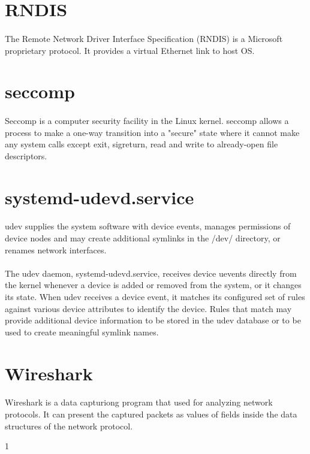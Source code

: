\documentclass[mscthesis]{usiinfthesis}
\begin{document}
\section{RNDIS}\label{sec:RNDIS}
\paragraph{}
The Remote Network Driver Interface Specification (RNDIS) is a Microsoft proprietary protocol. It provides a virtual Ethernet link to host OS.

\section{seccomp}\label{sec:seccomp}
\paragraph{}
Seccomp is a computer security facility in the Linux kernel. seccomp allows a process to make a one-way transition into a "secure" state where it cannot make any system calls except exit, sigreturn, read and write to already-open file descriptors.

\section{systemd-udevd.service}\label{sec:systemd-udevd.service}
\paragraph{}
udev supplies the system software with device events, manages permissions of device nodes and may create additional symlinks in the /dev/ directory, or renames network interfaces.
\paragraph{}
The udev daemon, systemd-udevd.service, receives device uevents directly from the kernel whenever a device is added or removed from the system, or it changes its state. When udev receives a device event, it matches its configured set of rules against various device attributes to identify the device. Rules that match may provide additional device information to be stored in the udev database or to be used to create meaningful symlink names.

\section{Wireshark}\label{sec:Wireshark}
\paragraph{}
Wireshark is a data capturiong program that used for analyzing network protocols. It can present the captured packets as values of fields inside the data structures of the network protocol.

%
%



1
\end{document}
